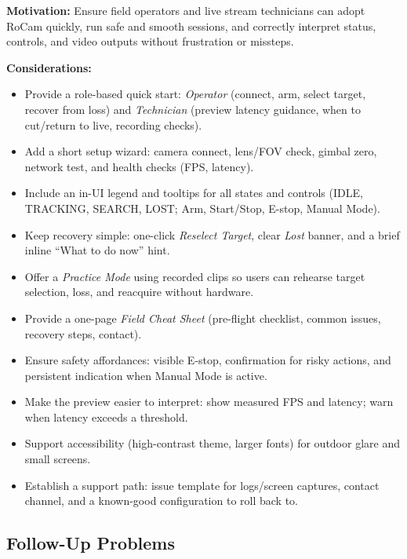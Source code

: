 \documentclass[12pt]{article}
\begin{document}
\textbf{Motivation:} Ensure field operators and live stream technicians can adopt RoCam quickly, run safe and smooth sessions, and correctly interpret status, controls, and video outputs without frustration or missteps.

\textbf{Considerations:}
\begin{itemize}
  \item Provide a role-based quick start: \emph{Operator} (connect, arm, select target,
        recover from loss) and \emph{Technician} (preview latency guidance, when to
        cut/return to live, recording checks).
  \item Add a short setup wizard: camera connect, lens/FOV check, gimbal zero, network
        test, and health checks (FPS, latency).
  \item Include an in-UI legend and tooltips for all states and controls (IDLE,
        TRACKING, SEARCH, LOST; Arm, Start/Stop, E-stop, Manual Mode).
  \item Keep recovery simple: one-click \emph{Reselect Target}, clear \emph{Lost}
        banner, and a brief inline “What to do now” hint.
  \item Offer a \emph{Practice Mode} using recorded clips so users can rehearse target
        selection, loss, and reacquire without hardware.
  \item Provide a one-page \emph{Field Cheat Sheet} (pre-flight checklist, common
        issues, recovery steps, contact).
  \item Ensure safety affordances: visible E-stop, confirmation for risky actions, and
        persistent indication when Manual Mode is active.
  \item Make the preview easier to interpret: show measured FPS and latency; warn when
        latency exceeds a threshold.
  \item Support accessibility (high-contrast theme, larger fonts) for outdoor glare and
        small screens.
  \item Establish a support path: issue template for logs/screen captures, contact
        channel, and a known-good configuration to roll back to.
\end{itemize}


\subsection{Follow-Up Problems}
\end{document}
